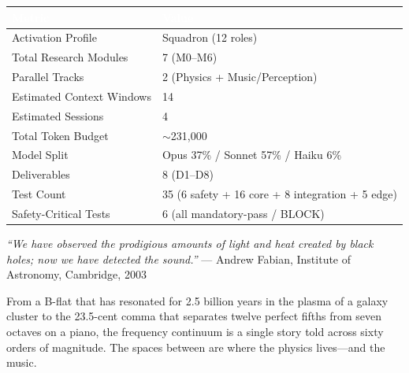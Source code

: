 \documentclass[11pt,letterpaper]{article}
\newcommand{\tableheader}[1]{\textbf{\sffamily\textcolor{white}{#1}}}
\begin{document}
\begin{center}
\begin{tabularx}{\textwidth}{L{5cm}X}
\toprule
{}
\tableheader{Metric} & \tableheader{Value} \\
\midrule
Activation Profile & Squadron (12 roles) \\
Total Research Modules & 7 (M0--M6) \\
Parallel Tracks & 2 (Physics + Music/Perception) \\
Estimated Context Windows & 14 \\
Estimated Sessions & 4 \\
Total Token Budget & $\sim$231,000 \\
Model Split & Opus 37\% / Sonnet 57\% / Haiku 6\% \\
Deliverables & 8 (D1--D8) \\
Test Count & 35 (6 safety + 16 core + 8 integration + 5 edge) \\
Safety-Critical Tests & 6 (all mandatory-pass / BLOCK) \\
\bottomrule
\end{tabularx}
\end{center}

\vspace{1em}

\begin{quotebox}
\textit{``We have observed the prodigious amounts of light and heat created by black holes; now we have detected the sound.''} --- Andrew Fabian, Institute of Astronomy, Cambridge, 2003

\vspace{0.5em}

From a B-flat that has resonated for 2.5 billion years in the plasma of a galaxy cluster to the 23.5-cent comma that separates twelve perfect fifths from seven octaves on a piano, the frequency continuum is a single story told across sixty orders of magnitude. The spaces between are where the physics lives---and the music.
\end{quotebox}
\end{document}
